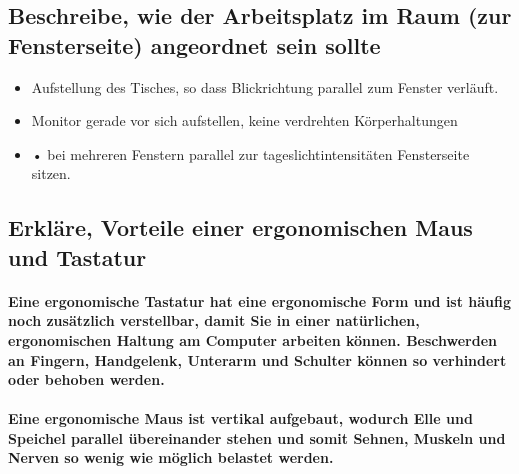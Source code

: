 \documentclass[a4paper]{article}
\begin{document}
    \subsection{\color{red}Beschreibe, wie der Arbeitsplatz im Raum (zur Fensterseite) angeordnet sein sollte}\label{subsec:beschreibe-wie-der-arbeitsplatz-im-raum-(zur-fensterseite)-angeordnet-sein-sollte}
    \begin{itemize}
        \color{magenta}
        \item Aufstellung des Tisches, so dass
        Blickrichtung parallel zum Fenster
        verläuft.
        \item Monitor gerade vor sich aufstellen,
        keine verdrehten Körperhaltungen
        \item • bei mehreren Fenstern parallel
        zur tageslichtintensitäten Fensterseite
        sitzen.
    \end{itemize}

    \subsection{\color{red}Erkläre, Vorteile einer ergonomischen Maus und Tastatur}\label{subsec:erkläre-vorteile-einer-ergonomischen-maus-und-tastatur}

    \paragraph{\color{codegreen} Eine \color{red} ergonomische Tastatur \color{codegreen} hat eine ergonomische Form und ist häufig noch zusätzlich verstellbar, damit Sie in einer natürlichen, ergonomischen Haltung am Computer arbeiten können. Beschwerden an Fingern, Handgelenk, Unterarm und Schulter können so verhindert oder behoben werden.}

    \paragraph{\color{codegreen} Eine \color{red}ergonomische Maus \color{codegreen} ist vertikal aufgebaut, wodurch Elle und Speichel parallel übereinander stehen und somit Sehnen, Muskeln und Nerven so wenig wie möglich belastet werden.}
\end{document}
